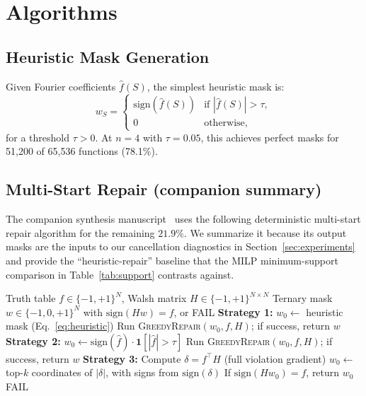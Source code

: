 \documentclass[11pt]{article}
\newcommand{\sign}{\mathrm{sign}}
\begin{document}
\section{Algorithms}
\label{sec:algorithms}

\subsection{Heuristic Mask Generation}

Given Fourier coefficients $\hat{f}(S)$, the simplest heuristic mask is:
\begin{equation}
\label{eq:heuristic}
    w_S = \begin{cases}
        \sign(\hat{f}(S)) & \text{if } |\hat{f}(S)| > \tau, \\
        0 & \text{otherwise},
    \end{cases}
\end{equation}
for a threshold $\tau > 0$. At $n=4$ with $\tau = 0.05$, this achieves perfect masks for 51{,}200 of 65{,}536 functions (78.1\%).

\subsection{Multi-Start Repair (companion summary)}

The companion synthesis manuscript~\cite{spectralSynthesisCompanion} uses the following deterministic multi-start repair algorithm for the remaining $21.9\%$. We summarize it because its output masks are the inputs to our cancellation diagnostics in Section~\ref{sec:experiments} and provide the ``heuristic-repair'' baseline that the MILP minimum-support comparison in Table~\ref{tab:support} contrasts against.

\begin{algorithm}[t]
\caption{Multi-Start Ternary Repair}
\label{alg:repair}
\begin{algorithmic}[1]
\REQUIRE Truth table $f \in \{-1,+1\}^N$, Walsh matrix $H \in \{-1,+1\}^{N \times N}$
\ENSURE Ternary mask $w \in \{-1,0,+1\}^N$ with $\sign(Hw) = f$, or FAIL
\STATE \textbf{Strategy 1:} $w_0 \gets$ heuristic mask (Eq.~\ref{eq:heuristic})
\STATE Run \textsc{GreedyRepair}$(w_0, f, H)$; if success, return $w$
    \STATE \textbf{Strategy 2:} $w_0 \gets \sign(\hat{f}) \cdot \mathbf{1}[|\hat{f}| > \tau]$
    \STATE Run \textsc{GreedyRepair}$(w_0, f, H)$; if success, return $w$
\ENDFOR
\STATE \textbf{Strategy 3:} Compute $\delta = f^\top H$ (full violation gradient)
    \STATE $w_0 \gets$ top-$k$ coordinates of $|\delta|$, with signs from $\sign(\delta)$
    \STATE If $\sign(H w_0) = f$, return $w_0$
\ENDFOR
\RETURN FAIL
\end{algorithmic}
\end{algorithm}
\end{document}
